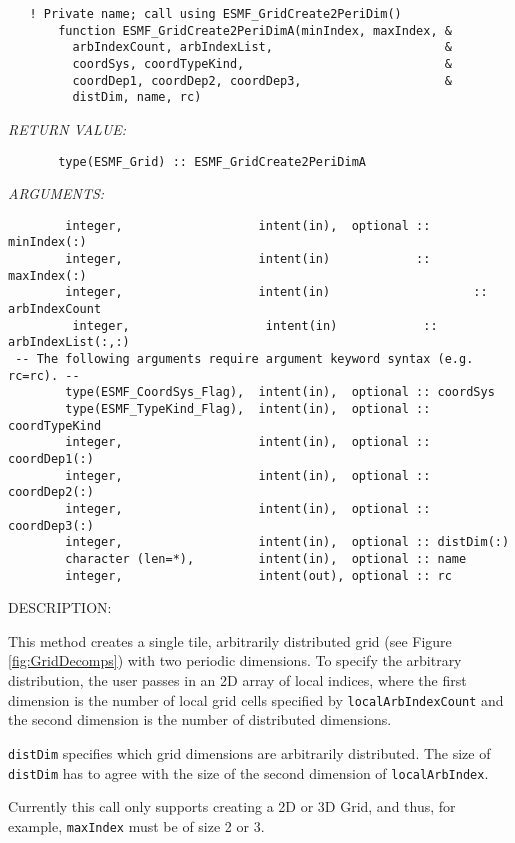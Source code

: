  
\begin{verbatim}   ! Private name; call using ESMF_GridCreate2PeriDim()
       function ESMF_GridCreate2PeriDimA(minIndex, maxIndex, &
         arbIndexCount, arbIndexList,                        &
         coordSys, coordTypeKind,                            &
         coordDep1, coordDep2, coordDep3,                    &
         distDim, name, rc)\end{verbatim}{\em RETURN VALUE:}
\begin{verbatim}       type(ESMF_Grid) :: ESMF_GridCreate2PeriDimA\end{verbatim}{\em ARGUMENTS:}
\begin{verbatim}        integer,                   intent(in),  optional :: minIndex(:)
        integer,                   intent(in)            :: maxIndex(:)
        integer,                   intent(in)                    :: arbIndexCount
         integer,                   intent(in)            :: arbIndexList(:,:)
 -- The following arguments require argument keyword syntax (e.g. rc=rc). --
        type(ESMF_CoordSys_Flag),  intent(in),  optional :: coordSys
        type(ESMF_TypeKind_Flag),  intent(in),  optional :: coordTypeKind
        integer,                   intent(in),  optional :: coordDep1(:)
        integer,                   intent(in),  optional :: coordDep2(:)
        integer,                   intent(in),  optional :: coordDep3(:)
        integer,                   intent(in),  optional :: distDim(:)
        character (len=*),         intent(in),  optional :: name
        integer,                   intent(out), optional :: rc\end{verbatim}
{\sf DESCRIPTION:\\ }


  
   This method creates a single tile, arbitrarily distributed grid
   (see Figure \ref{fig:GridDecomps}) with two periodic dimensions.
   To specify the arbitrary distribution, the user passes in an 2D array
   of local indices, where the first dimension is the number of local grid cells
   specified by {\tt localArbIndexCount} and the second dimension is the number of distributed
   dimensions.
  
   {\tt distDim} specifies which grid dimensions are arbitrarily distributed. The
   size of {\tt distDim} has to agree with the size of the second dimension of
   {\tt localArbIndex}.
  
   Currently this call
   only supports creating a 2D or 3D Grid, and thus, for example, {\tt maxIndex} must be of size 2 or 3.
  
